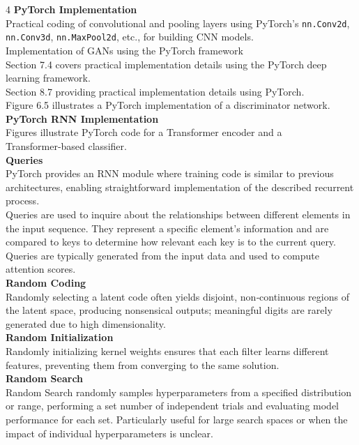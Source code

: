 \documentclass[8pt]{extarticle}
\begin{document}
\begin{multicols}{4}
\vspace{2pt}\textbf{PyTorch Implementation}\\
Practical coding of convolutional and pooling layers using PyTorch's \texttt{nn.Conv2d}, \texttt{nn.Conv3d}, \texttt{nn.MaxPool2d}, etc., for building CNN models.\\
Implementation of GANs using the PyTorch framework\\
Section 7.4 covers practical implementation details using the PyTorch deep learning framework.\\
Section 8.7 providing practical implementation details using PyTorch.\\
Figure 6.5 illustrates a PyTorch implementation of a discriminator network.\\

\vspace{2pt}\textbf{PyTorch RNN Implementation}\\
Figures illustrate PyTorch code for a Transformer encoder and a Transformer‑based classifier.\\
\vspace{2pt}\textbf{Queries}\\
PyTorch provides an RNN module where training code is similar to previous architectures, enabling straightforward implementation of the described recurrent process.\\
Queries are used to inquire about the relationships between different elements in the input sequence. They represent a specific element’s information and are compared to keys to determine how relevant each key is to the current query. Queries are typically generated from the input data and used to compute attention scores.\\
\vspace{2pt}\textbf{Random Coding}\\
Randomly selecting a latent code often yields disjoint, non‑continuous regions of the latent space, producing nonsensical outputs; meaningful digits are rarely generated due to high dimensionality.\\
\vspace{2pt}\textbf{Random Initialization}\\
Randomly initializing kernel weights ensures that each filter learns different features, preventing them from converging to the same solution.\\
\vspace{2pt}\textbf{Random Search}\\
Random Search randomly samples hyperparameters from a specified distribution or range, performing a set number of independent trials and evaluating model performance for each set. Particularly useful for large search spaces or when the impact of individual hyperparameters is unclear.\\

\end{multicols}
\end{document}
